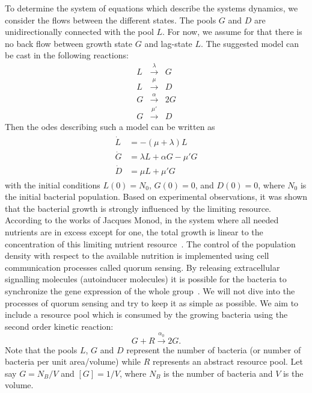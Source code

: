\documentclass[10pt,twocolumn,5p]{elsarticle}
\numberwithin{equation}{section}
\begin{document}
To determine the system of equations which describe the systems dynamics, we consider the flows between the different states.
The pools $G$ and $D$ are unidirectionally connected with the pool $L$.
For now, we assume for that there is no back flow between growth state $G$ and lag-state $L$.
The suggested model can be cast in the following reactions:
\begin{eqnarray}
    L &\stackrel{\lambda}{\longrightarrow} & G\\
    L &\stackrel{\mu}{\longrightarrow} & D\\
    G &\stackrel{\alpha}{\longrightarrow} & 2G\\
    G &\stackrel{\mu'}{\longrightarrow} & D
 \end{eqnarray}
Then the \acp{ode} describing such a model can be written as
\begin{align}\begin{split}
    \dot{L} &= -(\mu + \lambda) L\\
    \dot{G} &= \lambda L + \alpha G - \mu' G\\
    \dot{D} &= \mu  L + \mu' G 
\end{split}\end{align}
with the initial conditions $L(0)=N_0$, $G(0)=0$, and $D(0)=0$, where $N_0$ is the initial bacterial population.
%
Based on experimental observations, it was shown that the bacterial growth is strongly influenced by the limiting resource.
According to the works of Jacques Monod, in the system where all needed nutrients are in excess except for one, the total growth is linear to the concentration of this limiting nutrient resource~\cite{monod_growth_1949}.
The control of the population density with respect to the available nutrition is implemented using cell communication processes called quorum sensing.
By releasing extracellular signalling molecules (autoinducer molecules) it is possible for the bacteria to synchronize the gene expression of the whole group~\cite{ng_bacterial_2009}.
We will not dive into the processes of quorum sensing and try to keep it as simple as possible.
We aim to include a resource pool which is consumed by the growing bacteria using the second order kinetic reaction:
\begin{equation}
    G + R  \stackrel{\alpha_0}{\longrightarrow} 2G.
\end{equation}
Note that the pools $L$, $G$ and $D$ represent the number of bacteria (or number of bacteria per unit area/volume) while $R$ represents an abstract resource pool.
Let say $G=N_B/V$ and $[G]=1/V$, where $N_B$ is the number of bacteria and $V$ is the volume.
\end{document}
